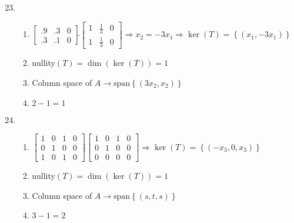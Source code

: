 \documentclass[12pt]{article}
\begin{document}
\begin{enumerate}
    \setcounter{enumi}{22}

  \item

    \begin{enumerate}

      \item $\left[ \begin{array}{cc|c} .9 & .3 & 0\\ .3 & .1 & 0\end{array} \right]\widetilde{ }\left[ \begin{array}{cc|c} 1 & \frac{1}{3} & 0\\ 1 & \frac{1}{3} & 0\end{array} \right]\Rightarrow x_2=-3x_1\Rightarrow\ker(T)=\left\{ (x_1,-3x_1) \right\}$

      \item nullity$(T)=\dim(\ker(T))=1$

      \item Column space of $A\rightarrow\text{span}\left\{ (3x_2,x_2) \right\}$

      \item $2-1=1$

    \end{enumerate}

    \setcounter{enumi}{24}

  \item

    \begin{enumerate}

      \item $\left[ \begin{array}{ccc|c} 1 & 0 & 1 & 0\\ 0 & 1 &0 & 0\\ 1 & 0 & 1 & 0  \end{array} \right]\widetilde{ }\left[ \begin{array}{ccc|c} 1 & 0 & 1 & 0\\ 0 & 1 & 0 & 0\\ 0 & 0 & 0 & 0  \end{array} \right]\Rightarrow\ker(T)=\left\{ (-x_3,0,x_3) \right\}$

      \item nullity$(T)=\dim(\ker(T))=1$

      \item Column space of $A\rightarrow\text{span}\left\{ (s,t,s) \right\}$

      \item $3-1=2$


\end{enumerate}
\end{enumerate}
\end{document}
